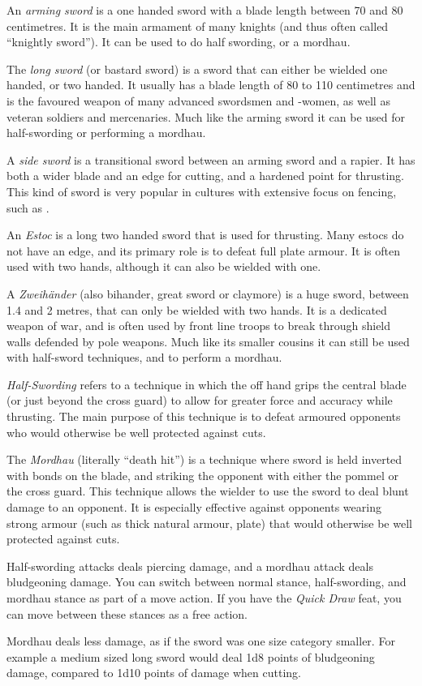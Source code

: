 An \emph{arming sword} is a one handed sword with a blade length between 70
and 80 centimetres. It is the main armament of many knights (and thus often
called ``knightly sword''). It can be used to do half swording, or a mordhau.

The \emph{long sword} (or bastard sword) is a sword that can either be wielded
one handed, or two handed. It usually has a blade length of 80 to 110
centimetres and is the favoured weapon of many advanced swordsmen and -women,
as well as veteran soldiers and mercenaries. Much like the arming sword it
can be used for half-swording or performing a mordhau.

A \emph{side sword} is a transitional sword between an arming sword and a
rapier. It has both a wider blade and an edge for cutting, and a hardened
point for thrusting. This kind of sword is very popular in cultures with
extensive focus on fencing, such as .

An \emph{Estoc} is a long two handed sword that is used for thrusting. Many
estocs do not have an edge, and its primary role is to defeat full plate
armour. It is often used with two hands, although it can also be wielded with
one.

A \emph{Zweihänder} (also bihander, great sword or claymore) is a huge sword,
between 1.4 and 2 metres, that can only be wielded with two hands. It is a
dedicated weapon of war, and is often used by front line troops to break
through shield walls defended by pole weapons. Much like its smaller cousins
it can still be used with half-sword techniques, and to perform a mordhau.

\emph{Half-Swording} refers to a technique in which the off hand grips the
central blade (or just beyond the cross guard) to allow for greater force and
accuracy while thrusting. The main purpose of this technique is to defeat
armoured opponents who would otherwise be well protected against cuts.

The \emph{Mordhau} (literally ``death hit'') is a technique where sword is
held inverted with bonds on the blade, and striking the opponent with either
the pommel or the cross guard. This technique allows the wielder to use the
sword to deal blunt damage to an opponent. It is especially effective against
opponents wearing strong armour (such as thick natural armour, plate) that
would otherwise be well protected against cuts.

\begin{note}
  Half-swording attacks deals piercing damage, and a mordhau attack deals
  bludgeoning damage. You can switch between normal stance, half-swording, and
  mordhau stance as part of a move action. If you have the \emph{Quick Draw}
  feat, you can move between these stances as a free action.

  Mordhau deals less damage, as if the sword was one size category
  smaller. For example a medium sized long sword would deal 1d8 points of
  bludgeoning damage, compared to 1d10 points of damage when cutting.
\end{note}
